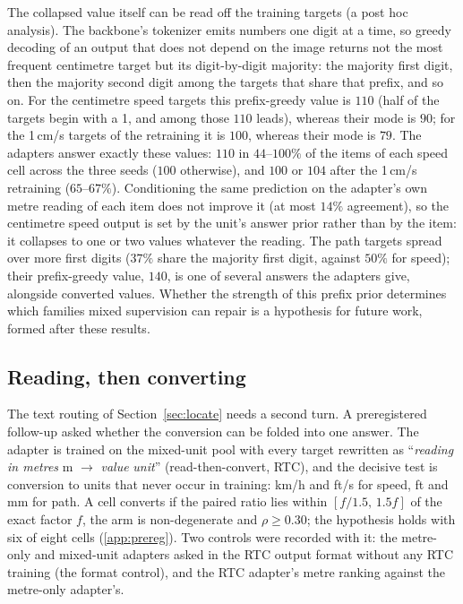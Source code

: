 \documentclass[preprint,number]{elsarticle}
\begin{document}
The collapsed value itself can be read off the training targets (a post hoc
analysis). The backbone's
tokenizer emits numbers one digit at a time, so greedy decoding of an output
that does not depend on the image returns not the most frequent centimetre
target but its digit-by-digit majority: the majority first digit, then the
majority second digit among the targets that share that prefix, and so on.
For the centimetre speed targets this prefix-greedy value is $110$ (half of
the targets begin with a 1, and among those $110$ leads), whereas their mode
is $90$; for the 1\,cm/s targets of the retraining it is $100$, whereas their
mode is $79$. The adapters answer exactly these values: $110$ in $44$--$100\%$
of the items of each speed cell across the three seeds ($100$ otherwise), and
$100$ or $104$ after the 1\,cm/s retraining ($65$--$67\%$). Conditioning the
same prediction on the adapter's own metre reading of each item does not
improve it (at most $14\%$ agreement), so the centimetre speed output is set
by the unit's answer prior rather than by the item: it collapses to one or two
values whatever the reading. The path targets spread over more first digits
($37\%$ share the majority first digit, against $50\%$ for speed); their
prefix-greedy value, $140$, is one of several answers the adapters give,
alongside converted values. Whether the strength of this prefix prior
determines which families mixed supervision can repair is a hypothesis for
future work, formed after these results.

\subsection{Reading, then converting}
\label{sec:rtc}

The text routing of Section~\ref{sec:locate} needs a second turn. A
preregistered follow-up asked whether the conversion can be folded into one
answer. The adapter is trained on the mixed-unit pool with every target
rewritten as ``\emph{reading in metres} m $\rightarrow$ \emph{value}
\emph{unit}'' (read-then-convert, RTC), and the decisive test is conversion to
units that never occur in training: km/h and ft/s for speed, ft and mm for
path. A cell converts if the paired ratio lies within $[f/1.5,\,1.5f]$ of the
exact factor $f$, the arm is non-degenerate and $\rho\ge0.30$; the hypothesis
holds with six of eight cells (\ref{app:prereg}). Two controls were recorded
with it: the metre-only and mixed-unit adapters asked in the RTC output format
without any RTC training (the format control), and the RTC adapter's metre
ranking against the metre-only adapter's.
\end{document}
